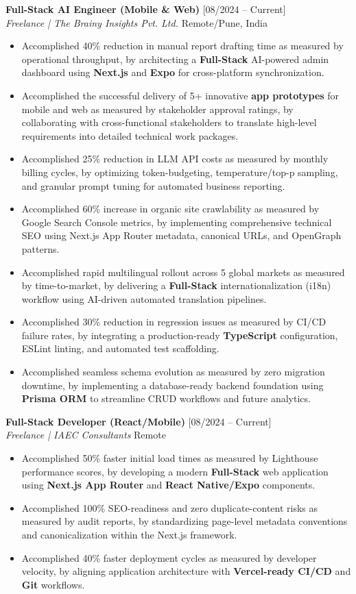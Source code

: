 \documentclass[10pt, a4paper]{article}
\begin{document}
\textbf{Full-Stack AI Engineer (Mobile \& Web)} \hfill [08/2024 – Current] \\
\textit{Freelance | The Brainy Insights Pvt. Ltd.} \hfill Remote/Pune, India
\begin{itemize}
    \item Accomplished 40\% reduction in manual report drafting time as measured by operational throughput, by architecting a \textbf{Full-Stack} AI-powered admin dashboard using \textbf{Next.js} and \textbf{Expo} for cross-platform synchronization.
    \item Accomplished the successful delivery of 5+ innovative \textbf{app prototypes} for mobile and web as measured by stakeholder approval ratings, by collaborating with cross-functional stakeholders to translate high-level requirements into detailed technical work packages.
    \item Accomplished 25\% reduction in LLM API costs as measured by monthly billing cycles, by optimizing token-budgeting, temperature/top-p sampling, and granular prompt tuning for automated business reporting.
    \item Accomplished 60\% increase in organic site crawlability as measured by Google Search Console metrics, by implementing comprehensive technical SEO using Next.js App Router metadata, canonical URLs, and OpenGraph patterns.
    \item Accomplished rapid multilingual rollout across 5 global markets as measured by time-to-market, by delivering a \textbf{Full-Stack} internationalization (i18n) workflow using AI-driven automated translation pipelines.
    \item Accomplished 30\% reduction in regression issues as measured by CI/CD failure rates, by integrating a production-ready \textbf{TypeScript} configuration, ESLint linting, and automated test scaffolding.
    \item Accomplished seamless schema evolution as measured by zero migration downtime, by implementing a database-ready backend foundation using \textbf{Prisma ORM} to streamline CRUD workflows and future analytics.
\end{itemize}

\vspace{4pt}
\textbf{Full-Stack Developer (React/Mobile)} \hfill [08/2024 – Current] \\
\textit{Freelance | IAEC Consultants} \hfill Remote
\begin{itemize}
    \item Accomplished 50\% faster initial load times as measured by Lighthouse performance scores, by developing a modern \textbf{Full-Stack} web application using \textbf{Next.js App Router} and \textbf{React Native/Expo} components.
    \item Accomplished 100\% SEO-readiness and zero duplicate-content risks as measured by audit reports, by standardizing page-level metadata conventions and canonicalization within the Next.js framework.
    \item Accomplished 40\% faster deployment cycles as measured by developer velocity, by aligning application architecture with \textbf{Vercel-ready CI/CD} and \textbf{Git} workflows.
\end{itemize}
\end{document}
